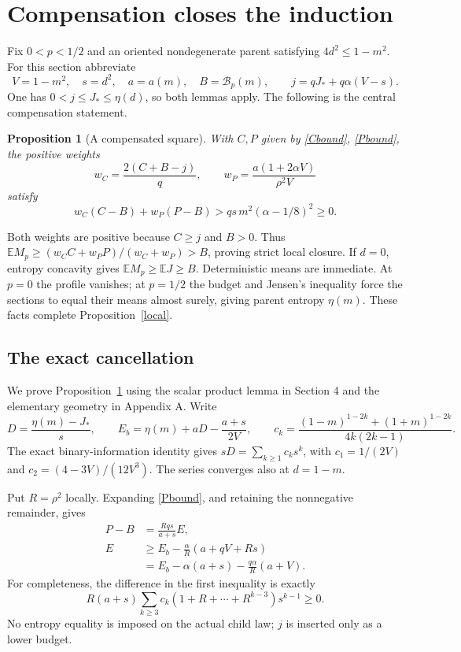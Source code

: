 \documentclass[11pt]{article}
\newtheorem{proposition}[theorem]{Proposition}
\newcommand{\E}{\mathbb E}\newcommand{\Prb}{\mathbb P}
\newcommand{\B}{\mathcal B_p}\newcommand{\dd}{\,\mathrm d}
\numberwithin{equation}{section}
\begin{document}
\section{Compensation closes the induction}
Fix $0<p<1/2$ and an oriented nondegenerate parent satisfying $4d^2\le1-m^2$. For this section abbreviate
\[
 V=1-m^2,\quad s=d^2,\quad a=a(m),\quad B=\B(m),
 \qquad j=qJ_*+q\alpha(V-s).
\]
One has $0<j\le J_*\le\eta(d)$, so both lemmas apply. The following is the central compensation statement.
\begin{proposition}[A compensated square]\label{square}
With $C,P$ given by \eqref{Cbound}, \eqref{Pbound}, the positive weights
\[
 w_C=\frac{2(C+B-j)}q,\qquad
 w_P=\frac{a(1+2\alpha V)}{\rho^2V}
\]
satisfy
\begin{equation}\label{squarebound}
 w_C(C-B)+w_P(P-B)>qs\,m^2(\alpha-1/8)^2\ge0.
\end{equation}
\end{proposition}
Both weights are positive because $C\ge j$ and $B>0$. Thus $\E M_p\ge(w_CC+w_PP)/(w_C+w_P)>B$, proving strict local closure. If $d=0$, entropy concavity gives $\E M_p\ge\E J\ge B$. Deterministic means are immediate. At $p=0$ the profile vanishes; at $p=1/2$ the budget and Jensen's inequality force the sections to equal their means almost surely, giving parent entropy $\eta(m)$. These facts complete Proposition~\ref{local}.

\subsection*{The exact cancellation}
We prove Proposition~\ref{square} using the scalar product lemma in Section 4 and the elementary geometry in Appendix A. Write
\[
 D=\frac{\eta(m)-J_*}{s},\qquad
 E_b=\eta(m)+aD-\frac{a+s}{2V},\qquad
 c_k=\frac{(1-m)^{1-2k}+(1+m)^{1-2k}}{4k(2k-1)}.
\]
The exact binary-information identity gives $sD=\sum_{k\ge1}c_ks^k$, with $c_1=1/(2V)$ and $c_2=(4-3V)/(12V^3)$. The series converges also at $d=1-m$.

Put $R=\rho^2$ locally. Expanding \eqref{Pbound}, and retaining the nonnegative remainder, gives
\begin{align}
 P-B&=\frac{Rqs}{a+s}E,\\
 E&\ge E_b-\frac\alpha R(a+qV+Rs)\nonumber\\
   &=E_b-\alpha(a+s)-\frac{q\alpha}R(a+V).
 \label{Ebound}
\end{align}
For completeness, the difference in the first inequality is exactly
\[
 R(a+s)\sum_{k\ge3}c_k(1+R+\cdots+R^{k-3})s^{k-1}\ge0.
\]
No entropy equality is imposed on the actual child law; $j$ is inserted only as a lower budget.
\end{document}
